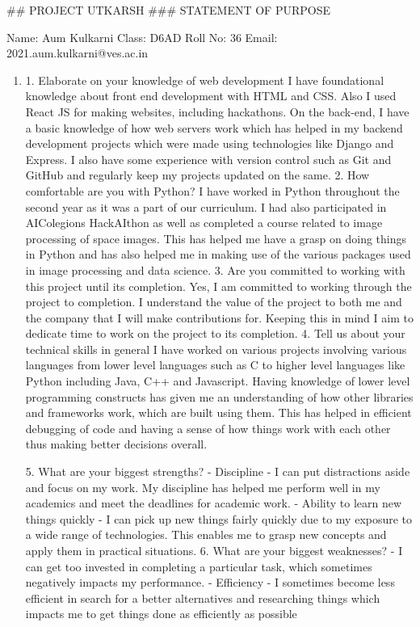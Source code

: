 \documentclass{article}[a4paper]
\begin{document}
## PROJECT UTKARSH
### STATEMENT OF PURPOSE

Name: Aum Kulkarni  
Class: D6AD    
Roll No: 36     
Email: 2021.aum.kulkarni@ves.ac.in     
\begin{enumerate}
    \item 1. Elaborate on your knowledge of web development    
    I have foundational knowledge about front end development with HTML and CSS. Also I used React JS for making websites, including  hackathons.
    On the back-end, I have a basic knowledge of how web servers work which has helped in my backend development projects which were made using technologies like Django and Express.
    I also have some experience with version control such as Git and GitHub and regularly keep my projects updated on the same.
    2. How comfortable are you with Python?    
    I have worked in Python throughout the second year as it was a part of our curriculum. I had also participated in AIColegions HackAIthon as well as completed a course related to image processing of space images. This has helped me have a grasp on doing things in Python and has also helped me in making use of the various packages used in image processing and data science.
    3. Are you committed to working with this project until its completion.    
    Yes, I am committed to working through the project to completion. I understand the value of the project to both me and the company that I will make contributions for. Keeping this in mind I aim to dedicate time to work on the project to its completion.
    4. Tell us about your technical skills in general    
    I have worked on various projects involving various languages from lower level languages such as C to higher level languages like Python including Java, C++ and Javascript.
    Having knowledge of lower level programming constructs has given me an understanding of how other libraries and frameworks work, which are built using them. 
    This has helped in efficient debugging of code and having a sense of how things work with each other thus making better decisions overall.
    
    5. What are your biggest strengths?    
        - Discipline - I can put distractions aside and focus on my work. My discipline has helped me perform well in my academics and meet the deadlines for academic work.
        - Ability to learn new things quickly - I can pick up new things fairly quickly due to my exposure to a wide range of technologies. This enables me to grasp new concepts and apply them in practical situations.
    6. What are your biggest weaknesses?    
        - I can get too invested in completing a particular task, which sometimes negatively impacts my performance.
        - Efficiency - I sometimes become less efficient in search for a better alternatives and researching things which impacts me to get things done as efficiently as possible
\end{enumerate}
\end{document}

